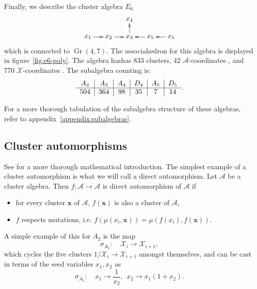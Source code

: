 \documentclass[11pt]{article}
\DeclareMathOperator{\Gr}{Gr}
\def\x{\mathcal{X}}
\def\xcoords{$\mathcal{X}$-coordinates }
\def\a{\mathcal{A}}
\def\acoords{$\mathcal{A}$-coordinates }
\begin{document}
Finally, we describe the cluster algebra $E_6$
\begin{equation}\label{def:E6}
    \begin{gathered}
    \begin{xy} 0;<1pt,0pt>:<0pt,-1pt>::
      (0,0) *+{x_1} ="1",
      (30,0) *+{x_2} ="2",
      (60,0) *+{x_3} ="3",
      (60,-25) *+{x_4} ="4",
      (90,0) *+{x_5} ="5",
      (120,0) *+{x_5} ="6",
      "1", {\ar"2"},
      "2", {\ar"3"},
      "3", {\ar"4"},
      "5", {\ar"3"},
      "6", {\ar"5"},
    \end{xy}
    \end{gathered}
\end{equation}
which is connected to $\Gr(4,7)$. The associahedron for this algebra is displayed in figure~\ref{fig:e6-poly}. The algebra hashas 833 clusters, 42 \acoords, and 770 \xcoords. The subalgebra counting is: 
\begin{equation}
\begin{tabular}{ c|c|c|c|c|c} 
 $A_2$ & $A_3$ & $A_4$ & $D_4$ & $A_5$ & $D_5$ \\ 
 \hline
504 & 364 & 98 & 35 & 7 & 14
\end{tabular}.
\end{equation}

For a more thorough tabulation of the subalgebra structure of these algebras, refer to appendix~\ref{appendix:subalgebras}.

\subsection{Cluster automorphisms}\label{sec:automorphisms}

See \cite{Chang:2015} for a more thorough mathematical introduction. The simplest example of a cluster automorphism is what we will call a direct automorphism. Let $\a$ be a cluster algebra. Then $f: \a \to \a$ is direct automorphism of $\a$ if
\begin{itemize}
  \item for every cluster $\mathbf{x}$ of $\a$, $f(\mathbf{x})$ is also a cluster of $\a$,
  \item $f$ respects mutations, i.e. $f(\mu(x_i,\mathbf{x})) = \mu(f(x_i),f(\mathbf{x}))$.
 \end{itemize} 
A simple example of this for $A_2$ is the map
\begin{equation}
  \sigma_{A_2}:\quad \mathcal{X}_i \to \mathcal{X}_{i+1},
\end{equation}
which cycles the five clusters $1/\x_i\to \x_{i+1}$ amongst themselves, and can be cast in terms of the seed variables $x_1, x_2$ as 
\begin{equation}
  \sigma_{A_2}:\quad x_1\to \frac{1}{x_2},~~ x_2\to x_1(1+x_2).
\end{equation}
\end{document}
